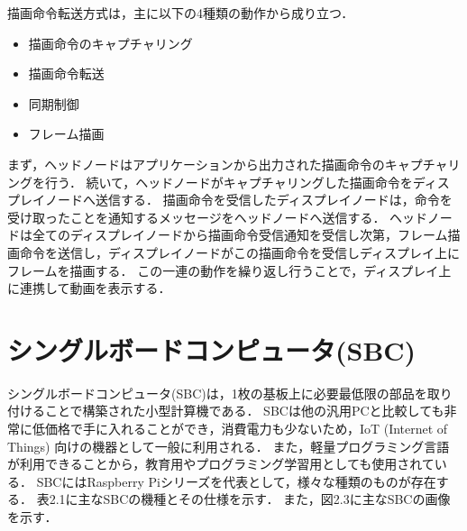 描画命令転送方式は，主に以下の4種類の動作から成り立つ．

\begin{itemize}
    \item 描画命令のキャプチャリング
    \item 描画命令転送
    \item 同期制御
    \item フレーム描画
\end{itemize}

  まず，ヘッドノードはアプリケーションから出力された描画命令のキャプチャリングを行う．
  続いて，ヘッドノードがキャプチャリングした描画命令をディスプレイノードへ送信する．
  描画命令を受信したディスプレイノードは，命令を受け取ったことを通知するメッセージをヘッドノードへ送信する．
  ヘッドノードは全てのディスプレイノードから描画命令受信通知を受信し次第，フレーム描画命令を送信し，ディスプレイノードがこの描画命令を受信しディスプレイ上にフレームを描画する．
  この一連の動作を繰り返し行うことで，ディスプレイ上に連携して動画を表示する．

\section{シングルボードコンピュータ(SBC)}

シングルボードコンピュータ(SBC)は，1枚の基板上に必要最低限の部品を取り付けることで構築された小型計算機である．
SBCは他の汎用PCと比較しても非常に低価格で手に入れることができ，消費電力も少ないため，IoT (Internet of Things) 向けの機器として一般に利用される\cite{130007722836,7380571}．
また，軽量プログラミング言語が利用できることから，教育用やプログラミング学習用としても使用されている．
SBCにはRaspberry Piシリーズを代表として，様々な種類のものが存在する．
表2.1に主なSBCの機種とその仕様を示す．
また，図2.3に主なSBCの画像を示す．

